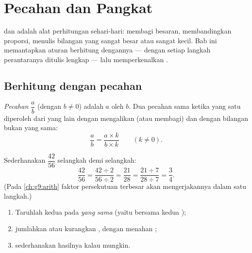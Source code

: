 \chapter{Pecahan dan Pangkat}\label{ch:g9:fractions}

 dan  adalah alat perhitungan sehari-hari: membagi
besaran, membandingkan proporsi, menulis bilangan yang sangat besar
atau sangat kecil. Bab ini memantapkan aturan berhitung dengannya ---
dengan setiap langkah perantaranya ditulis lengkap --- lalu
memperkenalkan .

\section{Berhitung dengan pecahan}

\begin{definition}[Pecahan]\label{def:g9:fractions:fraction}
\emph{Pecahan} $\dfrac ab$ (dengan $b \neq 0$) adalah
 $a$ oleh $b$. Dua pecahan sama ketika yang satu diperoleh
dari yang lain dengan mengalikan (atau membagi)  dan
 dengan bilangan bukan  yang sama:
\[
\frac ab = \frac{a \times k}{b \times k} \qquad (k \neq 0).
\]
\end{definition}

\begin{example}\label{ex:g9:fractions:simplify}
Sederhanakan $\dfrac{42}{56}$ selangkah demi selangkah:
\[
\frac{42}{56} = \frac{42 \div 2}{56 \div 2} = \frac{21}{28}
= \frac{21 \div 7}{28 \div 7} = \frac34 .
\]
(Pada \cref{ch:g9:arith} faktor persekutuan terbesar akan
mengerjakannya dalam satu langkah.)
\end{example}

\begin{method}\label{met:g9:fractions:add}
\begin{enumerate}
  \item Taruhlah kedua  pada \emph{ yang sama}
        (yaitu  bersama kedua );
  \item jumlahkan atau kurangkan , dengan menahan
        ;
  \item sederhanakan hasilnya kalau mungkin.
\end{enumerate}
\end{method}

